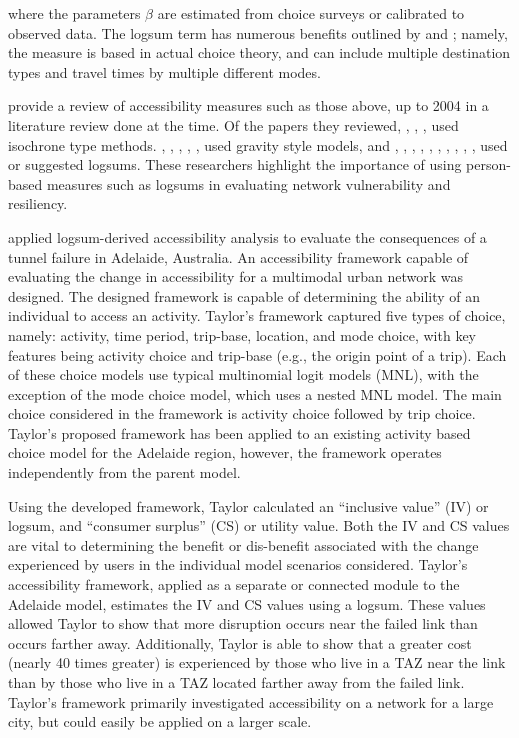 \noindent where the parameters $\beta$ are estimated from choice surveys or
calibrated to
observed data. The logsum term has numerous benefits outlined by
\citet{handy1997}
and \citet{geurs2004}; namely, the measure is based in actual choice
theory, and
can include multiple destination types and travel times by multiple
different modes.

\citet{geurs2004} provide a review of accessibility measures such as those
above, up to
2004 in a literature review done at the time. Of the papers they reviewed, \citet{vickerman1974}, \citet{ben1979}, \citet{geurs2001}, used isochrone type methods. \citet{stewart1947}, \citet{hansen1959}, \citet{ingram1971}, \citet{vickerman1974}, \citet{anas1983}, used gravity
style models, and \citet{neuburger1971}, \citet{leonardi1978}, \citet{williams1978}, \citet{koenig1980indicators}, \citet{anas1983}, \citet{ben1985discrete}, \citet{sweet1997aggregate}, \citet{niemeier1997accessibility}, \citet{handy1997}, \citet{levine1998rethinking}, \citet{miller1999measuring} used or
suggested logsums. These researchers highlight the importance of using person-based
measures such as logsums in
evaluating network vulnerability and resiliency.

\citet{taylor2008} applied logsum-derived accessibility analysis to
evaluate the consequences of a tunnel failure in Adelaide, Australia. An
accessibility framework capable of evaluating the change in accessibility
for a multimodal urban network was designed. The designed framework is
capable of determining the ability of an individual to access an activity.
Taylor's framework captured five types of choice, namely: activity, time period,
trip-base, location, and mode choice, with key features being activity
choice and trip-base (e.g., the origin point of a trip). Each of these choice
models use typical multinomial logit models (MNL), with the exception of
the mode choice model, which uses a nested MNL model. The main choice
considered in the framework is activity choice followed by trip choice.
Taylor's proposed framework has been applied to an existing activity based
choice model for the Adelaide region, however, the framework operates
independently from the parent model.

Using the developed framework, Taylor calculated an ``inclusive value'' (IV) or logsum,
and ``consumer surplus'' (CS) or utility value. Both the IV and CS values are vital to
determining the benefit or dis-benefit
associated with the change experienced by users in the individual model
scenarios considered. Taylor's accessibility framework, applied as a separate or connected module to
the Adelaide model, estimates the IV and CS values using a logsum.
These values allowed Taylor to show that more disruption occurs near the
failed link than occurs farther away. Additionally, Taylor is able to show
that a greater cost (nearly 40 times greater) is experienced by those who
live in a TAZ near the link than by those who live in a TAZ located
farther away from the failed link. Taylor's framework primarily
investigated accessibility on a network for a large city,
but could easily be applied on a larger scale.

